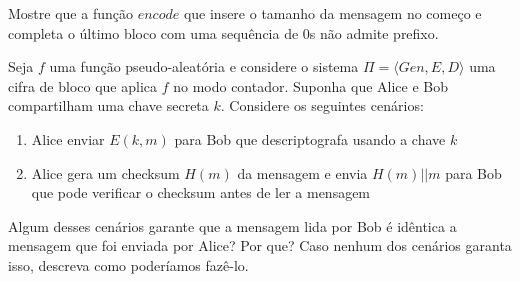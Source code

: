 \begin{exercicio}
  Mostre que a função $encode$ que insere o tamanho da mensagem no começo e completa o último bloco com uma sequência de $0$s não admite prefixo.
\end{exercicio}

\begin{exercicio}
  Seja $f$ uma função pseudo-aleatória e considere o sistema $\Pi = \langle Gen, E, D \rangle$ uma cifra de bloco que aplica $f$ no modo contador.
  Suponha que Alice e Bob compartilham uma chave secreta $k$.
  Considere os seguintes cenários:
  \begin{enumerate}
  \item Alice enviar $E(k, m)$ para Bob que descriptografa usando a chave $k$
  \item Alice gera um checksum $H(m)$ da mensagem e envia $H(m)||m$ para Bob que pode verificar o checksum antes de ler a mensagem
  \end{enumerate}
  Algum desses cenários garante que a mensagem lida por Bob é idêntica a mensagem que foi enviada por Alice? Por que? Caso nenhum dos cenários garanta isso, descreva como poderíamos fazê-lo. 
\end{exercicio}